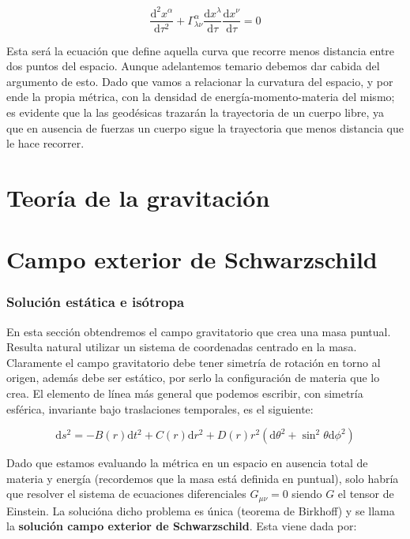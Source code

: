 \documentclass[12pt,a4paper]{book}
\numberwithin{equation}{section}
\numberwithin{figure}{section}
\newcommand{\D}{\mathrm{d}}
\newcommand{\derivadas}[2]{\frac{\D #1}{\D #2}}
\begin{document}
\begin{equation}
\derivadas{^2x^\alpha}{\tau^2} + \Gamma^\alpha_{\lambda \nu} \derivadas{x^\lambda}{\tau	} \derivadas{x^\nu}{\tau} = 0
\end{equation}

Esta será la ecuación que define aquella curva que recorre menos distancia entre dos puntos del espacio. Aunque adelantemos temario debemos dar cabida del argumento de esto. Dado que vamos a relacionar la curvatura del espacio, y por ende la propia métrica, con la densidad de energía-momento-materia del mismo; es evidente que la las geodésicas trazarán la trayectoria de un cuerpo libre, ya que en ausencia de fuerzas un cuerpo sigue la trayectoria que menos distancia que le hace recorrer. 

 \newpage

\chapter{Teoría de la gravitación}

\newpage

\chapter{Campo exterior de Schwarzschild}

\subsection{Solución estática e isótropa}


En esta sección obtendremos el campo gravitatorio que crea una masa puntual. Resulta natural utilizar un sistema de coordenadas centrado en la masa. Claramente el campo gravitatorio debe tener simetría de rotación en torno al origen, además debe ser estático, por serlo la configuración de materia que lo crea. El elemento de línea más general que podemos escribir, con simetría esférica, invariante bajo traslaciones temporales, es el siguiente:

\begin{equation}
\D s^2 = - B(r) \D t^2 + C(r) \D r^2 + D(r) r^2(\D \theta^2 + \sin^2 \theta \D \phi^2) 
\end{equation}

Dado que estamos evaluando la métrica en un espacio en ausencia total de materia y energía (recordemos que la masa está definida en puntual), solo habría que resolver el sistema de ecuaciones diferenciales $G_{\mu \nu} = 0$ siendo $G$ el tensor de Einstein. La solucióna dicho problema es única (teorema de Birkhoff) y se llama la \textbf{solución campo exterior de Schwarzschild}. Esta viene dada por:
\end{document}
